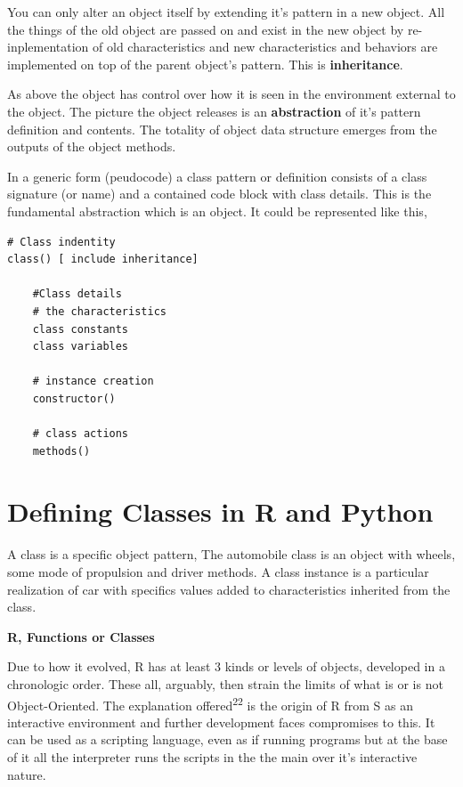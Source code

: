 \documentclass[]{book}
\theoremstyle{definition}
\theoremstyle{definition}
\theoremstyle{definition}
\theoremstyle{remark}
\begin{document}
You can only alter an object itself by extending it's pattern in a new
object. All the things of the old object are passed on and exist in the
new object by re-inplementation of old characteristics and new
characteristics and behaviors are implemented on top of the parent
object's pattern. This is \textbf{inheritance}.

As above the object has control over how it is seen in the environment
external to the object. The picture the object releases is an
\textbf{abstraction} of it's pattern definition and contents. The
totality of object data structure emerges from the outputs of the object
methods.

In a generic form (peudocode) a class pattern or definition consists of
a class signature (or name) and a contained code block with class
details. This is the fundamental abstraction which is an object. It
could be represented like this,

\begin{verbatim}
# Class indentity
class() [ include inheritance]

    #Class details
    # the characteristics
    class constants 
    class variables
  
    # instance creation
    constructor()
    
    # class actions
    methods()
\end{verbatim}

\section{Defining Classes in R and
Python}\label{defining-classes-in-r-and-python}

A class is a specific object pattern, The automobile class is an object
with wheels, some mode of propulsion and driver methods. A class
instance is a particular realization of car with specifics values added
to characteristics inherited from the class.

\textbf{R, Functions or Classes}

Due to how it evolved, R has at least 3 kinds or levels of objects,
developed in a chronologic order. These all, arguably, then strain the
limits of what is or is not Object-Oriented. The explanation
offered\textsuperscript{22} is the origin of R from S as an interactive
environment and further development faces compromises to this. It can be
used as a scripting language, even as if running programs but at the
base of it all the interpreter runs the scripts in the the main over
it's interactive nature.
\end{document}
